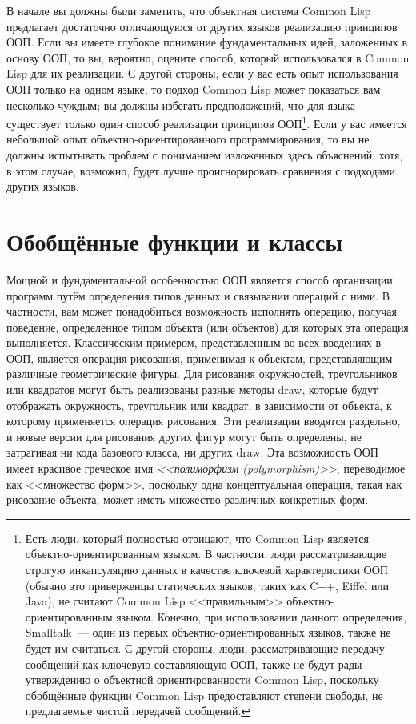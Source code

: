 В начале вы должны были заметить, что объектная система Common Lisp предлагает достаточно
отличающуюся от других языков реализацию принципов ООП. Если вы имеете глубокое понимание
фундаментальных идей, заложенных в основу ООП, то вы, вероятно, оцените способ, который
использовался в Common Lisp для их реализации.  С другой стороны, если у вас есть опыт
использования ООП только на одном языке, то подход Common Lisp может показаться вам
несколько чуждым; вы должны избегать предположений, что для языка существует только один
способ реализации принципов ООП\footnote{Есть люди, который полностью отрицают, что Common
  Lisp является объектно-ориентированным языком.  В частности, люди рассматривающие
  строгую инкапсуляцию данных в качестве ключевой характеристики ООП (обычно это
  приверженцы статических языков, таких как C++, Eiffel или Java), не считают Common Lisp
  <<правильным>> объектно-ориентированным языком.  Конечно, при использовании данного
  определения, Smalltalk~--- один из первых объектно-ориентированных языков, также не будет
  им считаться.  С другой стороны, люди, рассматривающие передачу сообщений как ключевую
  составляющую ООП, также не будут рады утверждению о объектной ориентированности Common
  Lisp, поскольку обобщённые функции Common Lisp предоставляют степени свободы, не
  предлагаемые чистой передачей сообщений.}.  Если у вас имеется небольшой опыт
объектно-ориентированного программирования, то вы не должны испытывать проблем с
пониманием изложенных здесь объяснений, хотя, в этом случае, возможно, будет лучше
проигнорировать сравнения с подходами других языков.

\section{Обобщённые функции и классы}

Мощной и фундаментальной особенностью ООП является способ организации программ путём
определения типов данных и связывании операций с ними.  В частности, вам может
понадобиться возможность исполнять операцию, получая поведение, определённое типом объекта
(или объектов) для которых эта операция выполняется. Классическим примером, представленным
во всех введениях в ООП, является операция рисования, применимая к объектам,
представляющим различные геометрические фигуры.  Для рисования окружностей, треугольников
или квадратов могут быть реализованы разные методы draw, которые будут отображать
окружность, треугольник или квадрат, в зависимости от объекта, к которому применяется
операция рисования. Эти реализации вводятся раздельно, и новые версии для рисования других
фигур могут быть определены, не затрагивая ни кода базового класса, ни других draw.  Эта
возможность ООП имеет красивое греческое имя \textit{<<полиморфизм (polymorphism)>>},
переводимое как <<множество форм>>, поскольку одна концептуальная операция, такая как
рисование объекта, может иметь множество различных конкретных форм.


